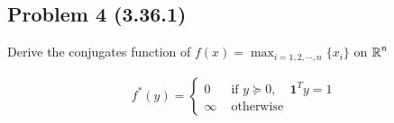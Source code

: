 \documentclass[en,hazy,blue,10pt,device = normal]{elegantnote}
\begin{document}
\subsection*{Problem 4 (3.36.1)}
Derive the conjugates function of \(f(x) = \max_{i = 1,2,\cdots ,n} \{x_i\}\) on \(\operatorname{\mathbb R}^n\)
\begin{tcolorbox}
    \sol

    \begin{align*}
        f^*(y)= \begin{cases}0 & \text { if } y \succeq 0, \quad \mathbf{1}^T y=1 \\ \infty & \text { otherwise }\end{cases}
    \end{align*}
\end{tcolorbox}
\end{document}
